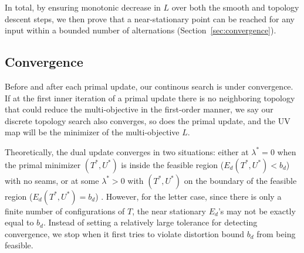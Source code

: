 In total, by ensuring monotonic decrease in $L$ over both the smooth and topology descent steps, we then prove that a near-stationary point can be reached for any input within a bounded number of alternations (Section~\ref{sec:convergence}). 

\subsection{Convergence}

Before and after each primal update, our continous search is under convergence. If at the first inner iteration of a primal update there is no neighboring topology that could reduce the multi-objective in the first-order manner, we say our discrete topology search also converges, so does the primal update, and the UV map will be the minimizer of the multi-objective $L$.

Theoretically, the dual update converges in two situations: either at $\lambda^* = 0$ when the primal minimizer $(T^*, U^*)$ is inside the feasible region ($E_d(T^*, U^*) < b_d$) with no seams, or at some $\lambda^* > 0$ with $(T^*, U^*)$ on the boundary of the feasible region ($E_d(T^*, U^*) = b_d$) \cite{a computational optimization book}. However, for the letter case, since there is only a finite number of configurations of $T$, the near stationary $E_d$'s may not be exactly equal to $b_d$. Instead of setting a relatively large tolerance for detecting convergence, we stop when it first tries to violate distortion bound $b_d$ from being feasible.
